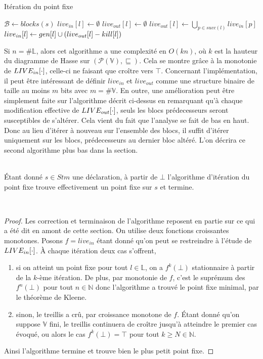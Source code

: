 \documentclass[a4paper, 10pt]{article}
\begin{document}
\begin{algorithm}[H]
	\caption{Itération du point fixe}
	\begin{algorithmic}
		\State $\mathcal{B} \leftarrow blocks(s)$
		\State $live_{in}[l] \leftarrow \emptyset$
		\State $live_{out}[l] \leftarrow \emptyset$
		\EndFor
		\State $live_{out}[l] \leftarrow \bigcup\limits_{p\in succ(l)} live_{in}[p]$
		\State $live_{in}[l] \leftarrow gen[l] \cup (live_{out}[l] - kill[l])$
		\EndFor
		\EndWhile
	\end{algorithmic}
\end{algorithm}
Si $n = \#\mathbb{L}$, alors cet algorithme a une complexité en $O(kn)$, où $k$ est la hauteur du diagramme
de Hasse sur $(\mathcal{P}(\mathbb{V}), \sqsubseteq)$. Cela se montre grâce à la monotonie de $LIVE_{in}[\cdot]$, 
celle-ci ne faisant que croître vers $\top$.
Concernant l'implémentation, il peut être intéressant de définir $live_{in}$ et $live_{out}$ comme une structure binaire de taille au
moins $m$ bits avec $m = \#\mathbb{V}$.
En outre, une amélioration peut être simplement faite sur l'algorithme décrit ci-dessus en remarquant qu'à chaque 
modification effective de $LIVE_{out}[\cdot]$, seuls les blocs prédecesseurs seront susceptibles de s'altérer. Cela
vient du fait que l'analyse se fait de bas en haut. Donc
au lieu d'itérer à nouveau sur l'ensemble des blocs, il suffit d'itérer uniquement sur les blocs, prédecesseurs au dernier
bloc altéré. L'on décrira ce second algorithme plus bas dans la section.
\\
\\
\begin{lemma}
	Étant donné $s \in Stm$ une déclaration, à partir de $\bot$ l'algorithme d'itération du point fixe trouve effectivement
	un point fixe sur $s$ et termine.
\end{lemma}
\\
\begin{proof}
Les correction et terminaison de l'algorithme reposent en partie sur ce qui a été dit en amont de cette section.
On utilise deux fonctions croissantes monotones. Posons $f = live_{in}$ étant donné qu'on peut se restreindre
à l'étude de $LIVE_{in}[\cdot]$. À chaque itération deux cas s'offrent,
\begin{enumerate}
	\item si on atteint un point fixe pour tout $l \in \mathbb{L}$, on a $f^k(\bot)$ stationnaire
	à partir de la $k$-ème itération. De plus, par monotonie de $f$, c'est le suprémum des $f^n(\bot)$ pour tout $n \in \mathbb{N}$ donc
	l'algorithme a trouvé le point fixe minimal, par le théorème de Kleene.
	\item sinon, le treillis a crû, par croissance monotone de $f$. Étant donné qu'on suppose $\mathbb{V}$ fini, le treillis continuera
	de croître jusqu'à atteindre le premier cas évoqué, ou alors le cas $f^k(\bot) = \top$ pour tout $k \ge N \in \mathbb{N}$.
\end{enumerate}
Ainsi l'algorithme termine et trouve bien le plus petit point fixe.
\end{proof}
\end{document}
